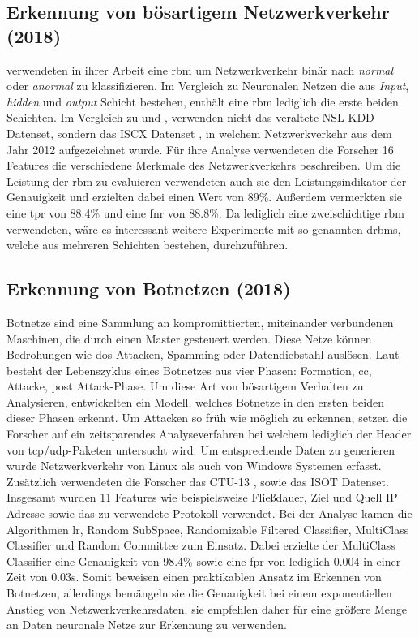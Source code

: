 \documentclass[
    12pt, %
    DIV10,
    ngerman, %
    a4paper, %
    oneside, %
    titlepage, %
    parskip=half, %
    headings=normal, %
    listof=totoc, %
    bibliography=totoc, %
    index=totoc, %
    captions=tableheading, %
    final %
]{scrreprt}
\begin{document}
\subsection{Erkennung von bösartigem Netzwerkverkehr (2018)}
\textcite{Aldwairi2018} verwendeten in ihrer Arbeit eine \ac{rbm} um Netzwerkverkehr binär nach \emph{normal} oder \emph{anormal} zu klassifizieren. Im Vergleich zu Neuronalen Netzen die aus \emph{Input}, \emph{hidden} und \emph{output} Schicht bestehen, enthält eine \ac{rbm} lediglich die erste beiden Schichten. Im Vergleich zu \textcite{Yin2017} und \textcite{Ding2018}, verwenden \textcite{Aldwairi2018} nicht das veraltete NSL-KDD Datenset, sondern das ISCX Datenset \parencite{shiravi2012toward}, in welchem Netzwerkverkehr aus dem Jahr 2012 aufgezeichnet wurde. Für ihre Analyse verwendeten die Forscher 16 Features die verschiedene Merkmale des Netzwerkverkehrs beschreiben.  Um die Leistung der \ac{rbm} zu evaluieren verwendeten auch sie den Leistungsindikator der Genauigkeit und erzielten dabei einen Wert von 89\%. Außerdem vermerkten sie eine \ac{tpr} von 88.4\% und eine \ac{fnr} von 88.8\%. Da \textcite{Aldwairi2018} lediglich eine zweischichtige \ac{rbm} verwendeten, wäre es interessant weitere Experimente mit so genannten \ac{drbms}, welche aus mehreren Schichten bestehen, durchzuführen.
%
\subsection{Erkennung von Botnetzen (2018)}
Botnetze sind eine Sammlung an kompromittierten, miteinander verbundenen Maschinen, die durch einen Master gesteuert werden. Diese Netze können Bedrohungen wie \ac{dos} Attacken, Spamming oder Datendiebstahl auslösen. Laut \textcite{leonard2009framework} besteht der Lebenszyklus eines Botnetzes aus vier Phasen: Formation, \ac{cc}, Attacke, post Attack-Phase. Um diese Art von bösartigem Verhalten zu Analysieren, entwickelten \textcite{Mathur2018} ein Modell, welches Botnetze in den ersten beiden dieser Phasen erkennt. Um Attacken so früh wie möglich zu erkennen, setzen die Forscher auf ein zeitsparendes Analyseverfahren bei welchem lediglich der Header von \ac{tcp}/\ac{udp}-Paketen untersucht wird. Um entsprechende Daten zu generieren wurde Netzwerkverkehr von Linux als auch von Windows Systemen erfasst. Zusätzlich verwendeten die Forscher das CTU-13 \parencite{garcia2014empirical}, sowie das ISOT \parencite{isot} Datenset. Insgesamt wurden 11 Features wie beispielsweise Fließdauer, Ziel und Quell IP Adresse sowie das zu verwendete Protokoll verwendet. Bei der Analyse kamen die Algorithmen \ac{lr}, Random SubSpace, Randomizable Filtered Classifier, MultiClass Classifier und Random Committee zum Einsatz. Dabei erzielte der MultiClass Classifier eine Genauigkeit von 98.4\% sowie eine \ac{fpr} von lediglich 0.004 in einer Zeit von 0.03s. Somit beweisen \textcite{Mathur2018} einen praktikablen Ansatz im Erkennen von Botnetzen, allerdings bemängeln sie die Genauigkeit bei einem exponentiellen Anstieg von Netzwerkverkehrsdaten, sie empfehlen daher für eine größere Menge an Daten neuronale Netze zur Erkennung zu verwenden.
%
\end{document}
